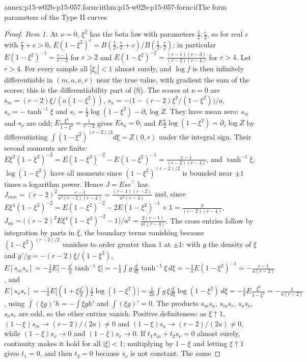\begin{annexitem}{annex:p15-w02b-p15-057.form-ii}{thm:p15-w02b-p15-057-form-ii}{The form parameters of the Type II curves}
\begin{proof}
\emph{Item 1.} At \(\nu=0\), \(\xi^2\) has the beta law with parameters
\(\frac12,\frac r2\), so for real \(c\) with \(\frac r2+c>0\),
\(E(1-\xi^2)^{c}=B(\frac12,\frac r2+c)/B(\frac12,\frac r2)\); in particular
\(E(1-\xi^2)^{-1}=\frac{r-1}{r-2}\) for \(r>2\) and
\(E(1-\xi^2)^{-2}=\frac{(r-1)(r-3)}{(r-2)(r-4)}\) for \(r>4\). Let \(r>4\).
For every sample all \(|\xi_i|<1\) almost surely, and \(\log f\) is then
infinitely differentiable in \((m,a,\nu,r)\) near the true value, with
gradient the sum of the scores; this is the differentiability part of
(S). The scores at \(\nu=0\) are
\(s_m=(r-2)\xi/(a(1-\xi^2))\),
\(s_a=-\bigl(1-(r-2)\xi^2/(1-\xi^2)\bigr)/a\),
\(s_\nu=-\tanh^{-1}\xi\) and
\(s_r=\frac12\log(1-\xi^2)-\partial_r\log Z\). They have mean zero:
\(s_m\) and \(s_\nu\) are odd; \(E\frac{\xi^2}{1-\xi^2}=\frac1{r-2}\) gives
\(Es_a=0\); and \(E\frac12\log(1-\xi^2)=\partial_r\log Z\) by differentiating
\(\int(1-\xi^2)^{(r-2)/2}d\xi=Z(0,r)\) under the integral sign. Their
second moments are finite: \(E\xi^2(1-\xi^2)^{-2}
=E(1-\xi^2)^{-2}-E(1-\xi^2)^{-1}=\frac{r-1}{(r-2)(r-4)}\), and
\(\tanh^{-1}\xi\), \(\log(1-\xi^2)\) have all moments since
\((1-\xi^2)^{(r-2)/2}\) is bounded near \(\pm1\) times a logarithm power.
Hence \(J=Ess^{\top}\) has
\(J_{mm}=(r-2)^2\frac{r-1}{a^2(r-2)(r-4)}=\frac{(r-1)(r-2)}{a^2(r-4)}\)
and, since \(E\xi^4(1-\xi^2)^{-2}=E(1-\xi^2)^{-2}-2E(1-\xi^2)^{-1}+1
=\frac3{(r-2)(r-4)}\),
\(J_{aa}=\bigl((r-2)^2E\xi^4(1-\xi^2)^{-2}-1\bigr)/a^2=\frac{2(r-1)}{a^2(r-4)}\).
The cross entries follow by integration by parts in \(\xi\), the boundary
terms vanishing because \((1-\xi^2)^{(r-2)/2}\) vanishes to order greater
than \(1\) at \(\pm1\): with \(g\) the density of \(\xi\) and
\(g'/g=-(r-2)\xi/(1-\xi^2)\),
\(E[s_m s_\nu]=-\frac1aE\bigl[-\frac{g'}g\tanh^{-1}\xi\bigr]
=-\frac1a\int g\,\frac{d}{d\xi}\tanh^{-1}\xi\,d\xi
=-\frac1aE(1-\xi^2)^{-1}=-\frac{r-1}{a(r-2)}\), and
\(E[s_as_r]=-\frac1aE\bigl[(1+\xi\frac{g'}g)\frac12\log(1-\xi^2)\bigr]
=\frac1{2a}\int g\,\xi\frac{d}{d\xi}\log(1-\xi^2)\,d\xi
=-\frac1aE\frac{\xi^2}{1-\xi^2}=-\frac1{a(r-2)}\), using
\(\int(\xi g)'h=-\int\xi g h'\) and \(\int(\xi g)'=0\). The products
\(s_ms_a\), \(s_ms_r\), \(s_as_\nu\), \(s_\nu s_r\) are odd, so the other
entries vanish. Positive definiteness: as \(\xi\uparrow1\),
\((1-\xi)s_m\to(r-2)/(2a)\neq0\) and \((1-\xi)s_a\to(r-2)/(2a)\neq0\),
while \((1-\xi)s_\nu\to0\) and \((1-\xi)s_r\to0\). If
\(t_1s_m+t_2s_\nu=0\) almost surely, continuity makes it hold for all
\(|\xi|<1\); multiplying by \(1-\xi\) and letting \(\xi\uparrow1\) gives
\(t_1=0\), and then \(t_2=0\) because \(s_\nu\) is not constant. The same

\end{proof}
\end{annexitem}
